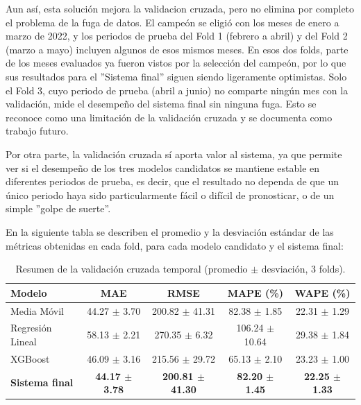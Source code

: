 Aun así, esta solución mejora la validacion cruzada, pero no elimina por completo el problema de la fuga de datos. El campeón se eligió con los meses de enero a marzo de 2022, y los periodos de prueba del Fold 1 (febrero a abril) y del Fold 2 (marzo a mayo) incluyen algunos de esos mismos meses. En esos dos folds, parte de los meses evaluados ya fueron vistos por la selección del campeón, por lo que sus resultados para el ”Sistema final” siguen siendo ligeramente optimistas. Solo el Fold 3, cuyo periodo de prueba (abril a junio) no comparte ningún mes con la validación, mide el desempeño del sistema final sin ninguna fuga. Esto se reconoce como una limitación de la validación cruzada y se documenta como trabajo futuro.

Por otra parte, la validación cruzada sí aporta valor al sistema, ya que permite ver si el desempeño de los tres modelos candidatos se mantiene estable en diferentes periodos de prueba, es decir, que el resultado no dependa de que un único periodo haya sido particularmente fácil o difícil de pronosticar, o de un simple ”golpe de suerte”.

En la siguiente tabla se describen el promedio y la desviación estándar de las métricas obtenidas en cada fold, para cada modelo candidato y el sistema final:

\begin{table}[H]
    \centering
    \caption{Resumen de la validación cruzada temporal (promedio $\pm$ desviación, 3 folds).}
    \label{tab:resumen_cv}
    \renewcommand{\arraystretch}{1.3}
    \begin{tabularx}{\textwidth}{|X|c|c|c|c|}
    \hline
    \textbf{Modelo} & \textbf{MAE} & \textbf{RMSE} & \textbf{MAPE (\%)} & \textbf{WAPE (\%)} \\
    \hline
    Media Móvil        & 44.27 $\pm$ 3.70  & 200.82 $\pm$ 41.31 & 82.38 $\pm$ 1.85  & 22.31 $\pm$ 1.29 \\
    \hline
    Regresión Lineal   & 58.13 $\pm$ 2.21  & 270.35 $\pm$ 6.32  & 106.24 $\pm$ 10.64 & 29.38 $\pm$ 1.84 \\
    \hline
    XGBoost            & 46.09 $\pm$ 3.16  & 215.56 $\pm$ 29.72 & 65.13 $\pm$ 2.10  & 23.23 $\pm$ 1.00 \\

    \hline
    \textbf{Sistema final} & \textbf{44.17 $\pm$ 3.78} & \textbf{200.81 $\pm$ 41.30} & \textbf{82.20 $\pm$ 1.45} & \textbf{22.25 $\pm$ 1.33} \\
    \hline
    \end{tabularx}
\end{table}


